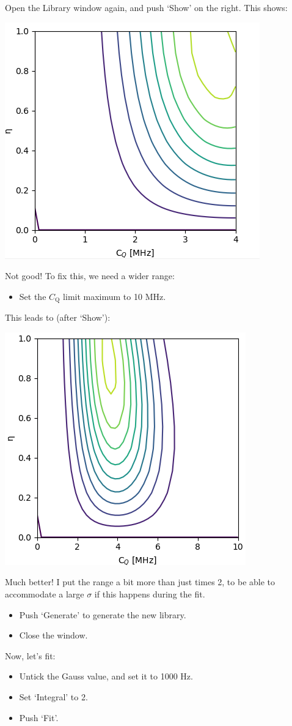 \documentclass[11pt,a4paper]{article}
\begin{document}
Open the Library window again, and push `Show' on the right. This shows:
\begin{center}
\includegraphics[width=0.5\linewidth]{Figs/fig6.PNG}
\end{center}
Not good! To fix this, we need a wider range:
\begin{itemize}
  \item Set the $C_\text{Q}$ limit maximum to 10 MHz.
\end{itemize}
This leads to (after `Show'):

\begin{center}
\includegraphics[width=0.5\linewidth]{Figs/fig7.PNG}
\end{center}
Much better! I put the range a bit more than just times 2, to be able to accommodate a large $\sigma$ if this happens during the fit.
\begin{itemize}
  \item Push `Generate' to generate the new library.
  \item Close the window.
\end{itemize}
Now, let's fit:
\begin{itemize}
  \item Untick the Gauss value, and set it to 1000 Hz.
  \item Set `Integral' to 2.
  \item Push `Fit'.
\end{itemize}
\end{document}
